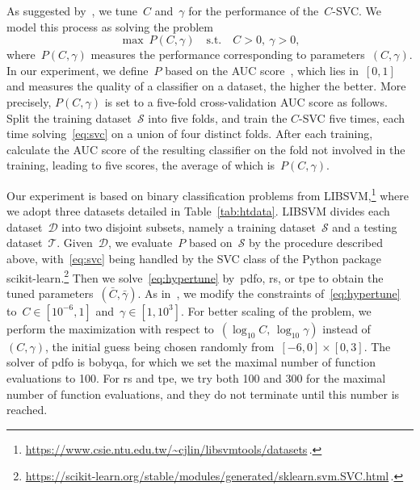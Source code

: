 \documentclass[manuscript,screen,review]{acmart}
\numberwithin{equation}{section}
\newcommand*{\st}{\text{s.t.}}
\begin{document}
As suggested by~\cite[\S~9]{Chang_Lin_2011}, we tune~$C$ and~$\gamma$ for the performance of the~$C$-SVC.
We model this process as solving the problem
\begin{equation}
    \label{eq:hypertune}
    \max ~ P(C, \gamma) \quad \st \quad C > 0, ~ \gamma > 0,
\end{equation}
where~$P(C, \gamma)$ measures the performance corresponding to parameters~$(C, \gamma)$.
In our experiment, we define~$P$ based on the AUC score~\cite[\S~3]{Ghanbari_Scheinberg_2017}, which lies in~$[0,1]$ and measures the quality of a classifier on a dataset, the higher the better.
More precisely, $P(C, \gamma)$ is set to a five-fold cross-validation AUC score as follows.
Split the training dataset~$\mathcal{S}$ into five folds, and train the $C$-SVC five times, each time solving~\eqref{eq:svc} on a union of four distinct folds.
After each training, calculate the AUC score of the resulting classifier on the fold not involved in the training, leading to five scores, the average of which is~$P(C, \gamma)$.

Our experiment is based on binary classification problems from \mbox{LIBSVM},\footnote{\url{https://www.csie.ntu.edu.tw/~cjlin/libsvmtools/datasets}\,.} where we adopt three datasets detailed in Table~\ref{tab:htdata}.
LIBSVM divides each dataset~$\mathcal{D}$ into two disjoint subsets, namely a training dataset~$\mathcal{S}$ and a testing dataset~$\mathcal{T}$.
Given~$\mathcal{D}$, we evaluate~$P$ based on~$\mathcal{S}$ by the procedure described above, with~\eqref{eq:svc} being handled by the SVC class of the Python package \mbox{scikit-learn}.\footnote{\url{https://scikit-learn.org/stable/modules/generated/sklearn.svm.SVC.html}\,.}
Then we solve~\eqref{eq:hypertune} by~\gls{pdfo}, \gls{rs}, or \gls{tpe} to obtain the tuned parameters~$(\bar{C}, \bar{\gamma})$.
As in~\cite[\S~5.3]{Ghanbari_Scheinberg_2017}, we modify the constraints of~\eqref{eq:hypertune} to~$C \in [10^{-6}, 1]$ and~$\gamma \in [1, 10^{3}]$.
For better scaling of the problem, we perform the maximization with respect to~$(\log_{10}C,\, \log_{10}\gamma)$ instead of~$(C, \gamma)$, the initial guess being chosen randomly from~$[-6, 0] \times [0, 3]$.
The solver of \gls{pdfo} is \gls{bobyqa}, for which we set the maximal number of function evaluations to \num{100}.
For \gls{rs} and \gls{tpe}, we try both \num{100} and \num{300} for the maximal number of function evaluations, and they do not terminate until this number is reached.
\end{document}
